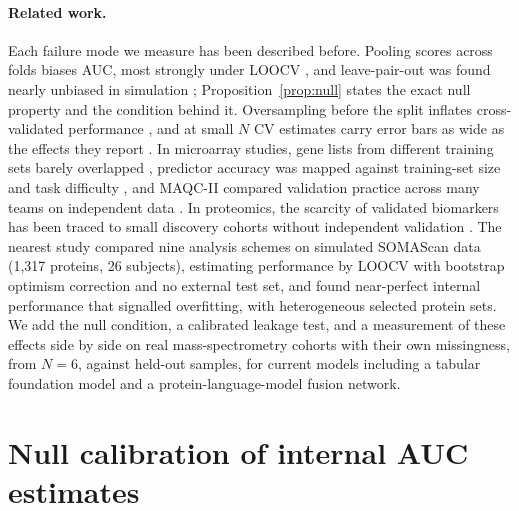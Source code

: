 \documentclass[10pt,letterpaper]{article}
\begin{document}
\paragraph{Related work.} Each failure mode we measure has been described before. Pooling scores across
folds biases AUC, most strongly under LOOCV \citep{parker2007stratification,forman2010apples,airola2011auc},
and leave-pair-out was found nearly unbiased in simulation \citep{airola2011auc}; Proposition~\ref{prop:null}
states the exact null property and the condition behind it. Oversampling before the split inflates
cross-validated performance \citep{santos2018cross}, and at small $N$ CV estimates carry error bars as wide as
the effects they report \citep{varoquaux2018cross,vabalas2019machine}. In microarray studies, gene lists from
different training sets barely overlapped \citep{eindor2006thousands,michiels2005prediction}, predictor
accuracy was mapped against training-set size and task difficulty \citep{popovici2010effect}, and MAQC-II
compared validation practice across many teams on independent data \citep{shi2010maqc}. In proteomics, the
scarcity of validated biomarkers has been traced to small discovery cohorts without independent validation
\citep{hernandez2014proteomics}. The nearest study \citep{lee2024small} compared nine analysis schemes on
simulated SOMAScan data (1,317 proteins, 26 subjects), estimating performance by LOOCV with bootstrap
optimism correction and no external test set, and found near-perfect internal performance that signalled
overfitting, with heterogeneous selected protein sets. We add the null condition, a calibrated leakage test,
and a measurement of these effects side by side on real mass-spectrometry cohorts with their own
missingness, from $N = 6$, against held-out samples, for current models including a tabular foundation
model \citep{hollmann2025tabpfn,tabpfn2026v35} and a protein-language-model fusion network.

\section{Null calibration of internal AUC estimates}\label{sec:theory}
\end{document}
